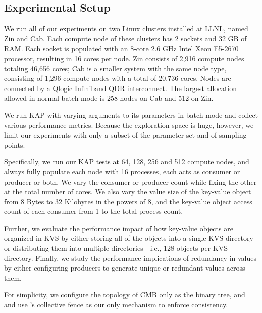 \subsection{Experimental Setup}
We run all of our experiments on two Linux clusters installed at LLNL,
named Zin and Cab.
Each compute node of these clusters has 2 sockets and 32 GB of RAM.
Each socket is populated with an 8-core 2.6 GHz Intel
Xeon E5-2670 processor, resulting in 16 cores per node.
Zin consists of 2,916 compute nodes totaling 46,656 cores;
Cab is a smaller system with the same node type,
consisting of 1,296 compute nodes with a total of 20,736 cores.
Nodes are connected by a Qlogic Infiniband QDR interconnect.
The largest allocation allowed in normal batch mode
is 258 nodes on Cab and 512 on Zin.

We run KAP with varying arguments to its parameters
in batch mode and collect various 
performance metrics. 
Because the exploration
space is huge, however, we limit our experiments with
only a subset of the parameter set and of sampling points.

Specifically, we run our KAP tests at 64, 128, 256 and 512
compute nodes, and always fully populate each node with
16 processes, each acts as consumer or producer or
both. We vary the consumer or producer count
while fixing the other at the total number of cores.
We also vary the value size of the key-value object
from 8 Bytes to 32 Kilobytes in the powers of 8,
and the key-value object access count of each consumer
from 1 to the total process count.

Further, we evaluate the performance impact 
of how key-value objects are organized 
in KVS by either storing all of the objects into a single KVS directory
or distributing them into multiple directories---i.e.,
128 objects per KVS directory.
Finally, we study the performance implications of 
redundancy in values by either configuring producers to generate
unique or redundant values across them.

For simplicity, we configure the topology of CMB only as 
the binary tree, and and use \flux's collective fence 
as our only mechanism to enforce consistency.
